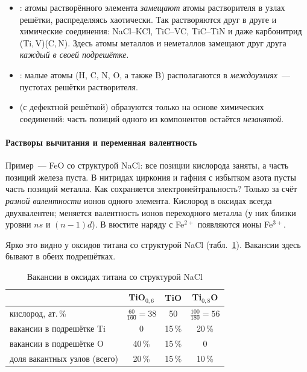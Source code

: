\begin{itemize}
\item {}: атомы растворённого элемента
\emph{замещают} атомы растворителя в узлах решётки, распределяясь
хаотически. Так растворяются друг в друге и химические соединения:
NaCl--KCl, TiC--VC, TiC--TiN и даже карбонитрид (Ti,\,V)(C,\,N). Здесь
атомы металлов и неметаллов замещают друг друга \emph{каждый в своей
подрешётке}.
\item {}: малые атомы (H, C, N, O, а также B)
располагаются в \emph{междоузлиях}~— пустотах решётки растворителя.
\item {} (с дефектной решёткой) образуются только
на основе химических соединений: часть позиций одного из компонентов
остаётся \emph{незанятой}.
\end{itemize}

\paragraph{Растворы вычитания и переменная валентность}
Пример~—  FeO со структурой NaCl: все позиции кислорода
заняты, а часть позиций железа пуста. В нитридах циркония и гафния с
избытком азота пусты часть позиций металла. Как сохраняется
электронейтральность? Только за счёт \emph{разной валентности} ионов
одного элемента. Кислород в оксидах всегда двухвалентен; меняется
валентность ионов переходного металла (у них близки уровни $ns$ и
$(n-1)d$). В вюстите наряду с Fe$^{2+}$ появляются ионы Fe$^{3+}$.

Ярко это видно у оксидов титана со структурой NaCl
(табл.~\ref{tab:TiO}). Вакансии здесь бывают в обеих подрешётках.

\begin{table}[ht]
\centering
\caption{Вакансии в оксидах титана со структурой NaCl}
\label{tab:TiO}
\small
\begin{tabular}{@{}lccc@{}}
\toprule
 & TiO$_{0,6}$ & TiO & Ti$_{0,8}$O \\
\midrule
кислород, ат.\,\% & $\frac{60}{160}=38$ & 50 & $\frac{100}{180}=56$ \\
вакансии в подрешётке Ti & 0 & 15\,\% & 20\,\% \\
вакансии в подрешётке O & 40\,\% & 15\,\% & 0 \\
доля вакантных узлов (всего) & 20\,\% & 15\,\% & 10\,\% \\
\bottomrule
\end{tabular}
\end{table}


